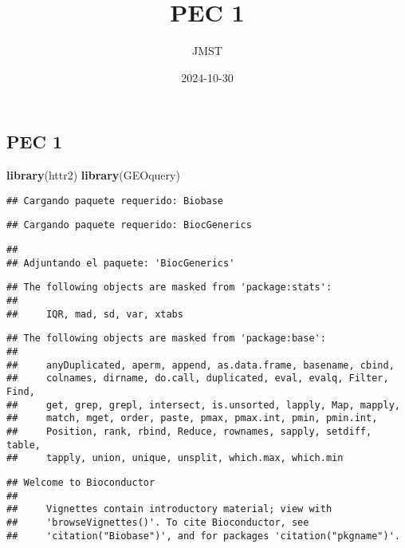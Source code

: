 \documentclass[
]{article}
\title{PEC 1}
\author{JMST}
\date{2024-10-30}
\newenvironment{Shaded}{\begin{snugshade}}{\end{snugshade}}
\newcommand{\FunctionTok}[1]{\textcolor[rgb]{0.13,0.29,0.53}{\textbf{#1}}}
\newcommand{\NormalTok}[1]{#1}
\begin{document}
\maketitle

\subsection{PEC 1}\label{pec-1}

\begin{Shaded}
\begin{Highlighting}[]
\FunctionTok{library}\NormalTok{(httr2)}
\FunctionTok{library}\NormalTok{(GEOquery)}
\end{Highlighting}
\end{Shaded}

\begin{verbatim}
## Cargando paquete requerido: Biobase
\end{verbatim}

\begin{verbatim}
## Cargando paquete requerido: BiocGenerics
\end{verbatim}

\begin{verbatim}
## 
## Adjuntando el paquete: 'BiocGenerics'
\end{verbatim}

\begin{verbatim}
## The following objects are masked from 'package:stats':
## 
##     IQR, mad, sd, var, xtabs
\end{verbatim}

\begin{verbatim}
## The following objects are masked from 'package:base':
## 
##     anyDuplicated, aperm, append, as.data.frame, basename, cbind,
##     colnames, dirname, do.call, duplicated, eval, evalq, Filter, Find,
##     get, grep, grepl, intersect, is.unsorted, lapply, Map, mapply,
##     match, mget, order, paste, pmax, pmax.int, pmin, pmin.int,
##     Position, rank, rbind, Reduce, rownames, sapply, setdiff, table,
##     tapply, union, unique, unsplit, which.max, which.min
\end{verbatim}

\begin{verbatim}
## Welcome to Bioconductor
## 
##     Vignettes contain introductory material; view with
##     'browseVignettes()'. To cite Bioconductor, see
##     'citation("Biobase")', and for packages 'citation("pkgname")'.
\end{verbatim}
\end{document}
